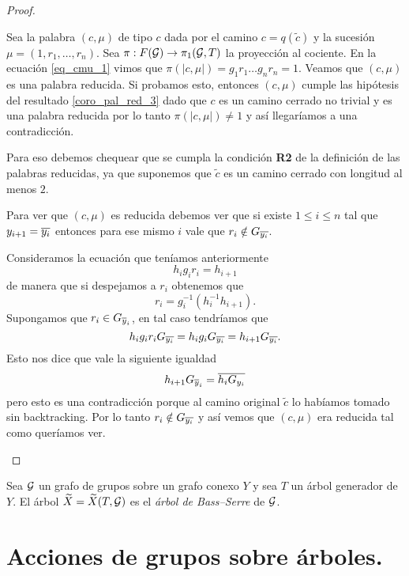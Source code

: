 \documentclass[tesis.tex]{subfiles}
\begin{document}
\begin{proof}
\begin{itemize}
		
		Sea la palabra $(c, \mu)$ de tipo $c$ dada por el camino $c= q(\tilde c)$ y la sucesión $\mu = (1,r_1, \dots, r_n)$.
		Sea $\pi:F({\cal G}) \to \pi_1({\cal G},T)$ la proyección al cociente.
		En la ecuación \ref{eq_cmu_1} vimos que $\pi(|c, \mu|) = g_1r_1\dots g_nr_n = 1$.
		Veamos que $(c, \mu)$ es una palabra reducida.
		Si probamos esto, entonces $(c, \mu)$ cumple las hipótesis del resultado \ref{coro_pal_red_3} dado que $c$ es un camino cerrado no trivial y es una palabra reducida por lo tanto $\pi(|c, \mu|) \neq 1$ y así llegaríamos a una contradicción.
		
		Para eso debemos chequear que se cumpla la condición \textbf{R2} de la definición de las palabras reducidas, ya que suponemos que $\widetilde c$ es un camino cerrado con longitud al menos $2$.
		
		Para ver que $(c, \mu)$ es reducida debemos ver que si
		existe $ 1 \le i \le n$ tal que $y_{i+1} = \overline{y_i}$ entonces para ese mismo $i$ vale que $r_i \notin G_{\overline{y_{i}}}$.
		
		
		Consideramos la ecuación que teníamos anteriormente
		\[
		h_ig_ir_i = h_{i+1}
		\]
		de manera que si despejamos a $r_{i}$ obtenemos que
		\[
		r_i =   g_i^{-1}(h_i^{-1} h_{i+1} ).
		\]
		Supongamos que $r_{i} \in G_{\overline y_{i}}$, en tal caso tendríamos que 
		\[
		 h_ig_ir_i G_{\overline{y_i}} = h_ig_i G_{\overline{y_i}} = h_{i+1}G_{\overline{y_i}}.
		\] 
		Esto nos dice que vale la siguiente igualdad 
		\[
		h_{i+1}G_{\overline y_{i}} = \overline{h_{i}G_{y_i}}
		\]
		pero esto es una contradicción porque al camino original $\tilde c$ lo habíamos tomado sin backtracking. 
		Por lo tanto $r_{i} \notin G_{\overline{y_{i}}}$ y así vemos que $(c, \mu)$ era reducida tal como queríamos ver.
	\end{itemize}
	
	
	
	
	
\end{proof}

\begin{deff}
	Sea ${\cal G}$ un grafo de grupos sobre un grafo conexo $Y$ y sea $T$ un árbol generador de $Y$.	
	El árbol $\widetilde{ X} = \widetilde{ X} (T, {\cal G})$ es el \emph{árbol de Bass--Serre} de ${\cal G}$.
\end{deff}



\section{Acciones de grupos sobre árboles.}\label{secc_acciones_arboles}
\end{document}

